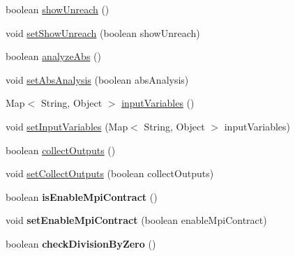 \begin{DoxyCompactItemize}
\item 
boolean \hyperlink{classedu_1_1udel_1_1cis_1_1vsl_1_1civl_1_1config_1_1IF_1_1CIVLConfiguration_a37c8254842a052a67d289d08121dec28}{show\+Unreach} ()
\item 
void \hyperlink{classedu_1_1udel_1_1cis_1_1vsl_1_1civl_1_1config_1_1IF_1_1CIVLConfiguration_a5b518209f2420f9dd63877a0a27e6c1f}{set\+Show\+Unreach} (boolean show\+Unreach)
\item 
boolean \hyperlink{classedu_1_1udel_1_1cis_1_1vsl_1_1civl_1_1config_1_1IF_1_1CIVLConfiguration_a8a8fd6832a3b521a7245493c3e95f977}{analyze\+Abs} ()
\item 
void \hyperlink{classedu_1_1udel_1_1cis_1_1vsl_1_1civl_1_1config_1_1IF_1_1CIVLConfiguration_a852d9de751f24a0d733c1a34db88874b}{set\+Abs\+Analysis} (boolean abs\+Analysis)
\item 
Map$<$ String, Object $>$ \hyperlink{classedu_1_1udel_1_1cis_1_1vsl_1_1civl_1_1config_1_1IF_1_1CIVLConfiguration_a813ee1e665e1825f5eae2673755f9775}{input\+Variables} ()
\item 
void \hyperlink{classedu_1_1udel_1_1cis_1_1vsl_1_1civl_1_1config_1_1IF_1_1CIVLConfiguration_a5835d5ac81e32990d51906158347fbfb}{set\+Input\+Variables} (Map$<$ String, Object $>$ input\+Variables)
\item 
boolean \hyperlink{classedu_1_1udel_1_1cis_1_1vsl_1_1civl_1_1config_1_1IF_1_1CIVLConfiguration_aec51ed973910759e74f089cd83931ac8}{collect\+Outputs} ()
\item 
void \hyperlink{classedu_1_1udel_1_1cis_1_1vsl_1_1civl_1_1config_1_1IF_1_1CIVLConfiguration_a5f639fd878c6069e33a5d57bd57b4bee}{set\+Collect\+Outputs} (boolean collect\+Outputs)
\item 
\hypertarget{classedu_1_1udel_1_1cis_1_1vsl_1_1civl_1_1config_1_1IF_1_1CIVLConfiguration_a88d205a4c57f44e53e5e9595ce008bb9}{}boolean {\bfseries is\+Enable\+Mpi\+Contract} ()\label{classedu_1_1udel_1_1cis_1_1vsl_1_1civl_1_1config_1_1IF_1_1CIVLConfiguration_a88d205a4c57f44e53e5e9595ce008bb9}

\item 
\hypertarget{classedu_1_1udel_1_1cis_1_1vsl_1_1civl_1_1config_1_1IF_1_1CIVLConfiguration_a1cda1e69ae1a13594e945ac643e4e799}{}void {\bfseries set\+Enable\+Mpi\+Contract} (boolean enable\+Mpi\+Contract)\label{classedu_1_1udel_1_1cis_1_1vsl_1_1civl_1_1config_1_1IF_1_1CIVLConfiguration_a1cda1e69ae1a13594e945ac643e4e799}

\item 
\hypertarget{classedu_1_1udel_1_1cis_1_1vsl_1_1civl_1_1config_1_1IF_1_1CIVLConfiguration_a33e6a1dc4a5287fa4e137e0606506c65}{}boolean {\bfseries check\+Division\+By\+Zero} ()\label{classedu_1_1udel_1_1cis_1_1vsl_1_1civl_1_1config_1_1IF_1_1CIVLConfiguration_a33e6a1dc4a5287fa4e137e0606506c65}


\end{DoxyCompactItemize}
